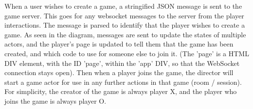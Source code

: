 \documentclass[]{interim}
\begin{document}
When a user wishes to create a game, a stringified JSON message is sent to the game server.
This goes for any websocket messages to the server from the player interactions.
The message is parsed to identify that the player wishes to create a game. As seen in the diagram,
messages are sent to update the states of multiple actors, and the player's page is updated to tell
them that the game has been created, and which code to use for someone else to join it.
(The 'page' is a HTML DIV element, with the ID 'page', within the 'app' DIV, so that the WebSocket
connection stays open). Then when a player joins the game, the director will start
a game actor for use in any further actions in that game (room / session). For simplicity,
the creator of the game is always player X, and the player who joins the game is always player O.
\end{document}
